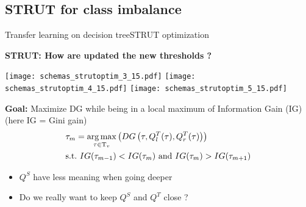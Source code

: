\subsection{STRUT for class imbalance}

\begin{frame}{Transfer learning on decision tree}{STRUT optimization}
\begin{minipage}[t]{0.4\linewidth}
    \vspace{0pt}
    \centering
    \textbf{STRUT: How are updated the new thresholds ?}\\
    \renewcommand{\ratio}{1.0}
    \begin{overprint}
        \texttt{[image: schemas\_strutoptim\_3\_15.pdf]}
        \texttt{[image: schemas\_strutoptim\_4\_15.pdf]}
        \texttt{[image: schemas\_strutoptim\_5\_15.pdf]}
    \end{overprint}
\end{minipage}\hfill
\begin{minipage}[t]{0.55\linewidth}
    \vspace{0pt}
    
    \textbf{Goal: } Maximize DG while being in a local maximum of Information Gain (IG) (here IG = Gini gain)
    \pause \pause \pause
    \begin{align*}
        &\tau_{m} = \operatorname*{arg\,max}_{\tau \in \mathrm{T}_{v}}\left(DG\left(  \tau ,  Q_{l}^{T}(\tau), Q_{r}^{T}(\tau)\right)\right) \\
        &\text{s.t.\ } IG(\tau_{m-1}) < IG(\tau_{m}) \text{ and } IG(\tau_{m}) > IG(\tau_{m+1})
    \end{align*}
    \vspace{1cm}

    \pause
    \begin{itemize}
        \item  $Q^S$ have less meaning when going deeper
        \item  Do we really want to keep $Q^S$ and $Q^T$ close ?
    \end{itemize}
\end{minipage}

\end{frame}

